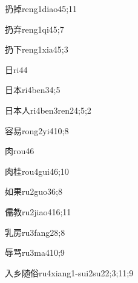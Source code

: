 \begin{verbete}{扔掉}{reng1diao4}{5;11}
\end{verbete}
\begin{verbete}{扔弃}{reng1qi4}{5;7}
\end{verbete}
\begin{verbete}{扔下}{reng1xia4}{5;3}
\end{verbete}
\begin{verbete}{日}{ri4}{4}
\end{verbete}
\begin{verbete}{日本}{ri4ben3}{4;5}
\end{verbete}
\begin{verbete}{日本人}{ri4ben3ren2}{4;5;2}
\end{verbete}
\begin{verbete}{容易}{rong2yi4}{10;8}
\end{verbete}
\begin{verbete}{肉}{rou4}{6}
\end{verbete}
\begin{verbete}{肉桂}{rou4gui4}{6;10}
\end{verbete}
\begin{verbete}{如果}{ru2guo3}{6;8}
\end{verbete}
\begin{verbete}{儒教}{ru2jiao4}{16;11}
\end{verbete}
\begin{verbete}{乳房}{ru3fang2}{8;8}
\end{verbete}
\begin{verbete}{辱骂}{ru3ma4}{10;9}
\end{verbete}
\begin{verbete}{入乡随俗}{ru4xiang1-sui2su2}{2;3;11;9}
\end{verbete}

